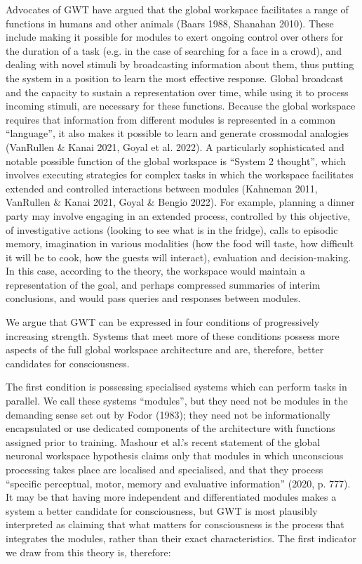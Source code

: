 \documentclass[12pt]{article}
\begin{document}
Advocates of GWT have argued that the global workspace facilitates a range of functions in humans and other animals (Baars 1988, Shanahan 2010). These include making it possible for modules to exert ongoing control over others for the duration of a task (e.g. in the case of searching for a face in a crowd), and dealing with novel stimuli by broadcasting information about them, thus putting the system in a position to learn the most effective response. Global broadcast and the capacity to sustain a representation over time, while using it to process incoming stimuli, are necessary for these functions. Because the global workspace requires that information from different modules is represented in a common ``language'', it also makes it possible to learn and generate crossmodal analogies (VanRullen \& Kanai 2021, Goyal et al. 2022). A particularly sophisticated and notable possible function of the global workspace is ``System 2 thought'', which involves executing strategies for complex tasks in which the workspace facilitates extended and controlled interactions between modules (Kahneman 2011, VanRullen \& Kanai 2021, Goyal \& Bengio 2022). For example, planning a dinner party may involve engaging in an extended process, controlled by this objective, of investigative actions (looking to see what is in the fridge), calls to episodic memory, imagination in various modalities (how the food will taste, how difficult it will be to cook, how the guests will interact), evaluation and decision-making. In this case, according to the theory, the workspace would maintain a representation of the goal, and perhaps compressed summaries of interim conclusions, and would pass queries and responses between modules.

We argue that GWT can be expressed in four conditions of progressively increasing strength. Systems that meet more of these conditions possess more aspects of the full global workspace architecture and are, therefore, better candidates for consciousness.

The first condition is possessing specialised systems which can perform tasks in parallel. We call these systems ``modules'', but they need not be modules in the demanding sense set out by Fodor (1983); they need not be informationally encapsulated or use dedicated components of the architecture with functions assigned prior to training. Mashour et al.’s recent statement of the global neuronal workspace hypothesis claims only that modules in which unconscious processing takes place are localised and specialised, and that they process ``specific perceptual, motor, memory and evaluative information'' (2020, p. 777). It may be that having more independent and differentiated modules makes a system a better candidate for consciousness, but GWT is most plausibly interpreted as claiming that what matters for consciousness is the process that integrates the modules, rather than their exact characteristics. The first indicator we draw from this theory is, therefore:
\end{document}
